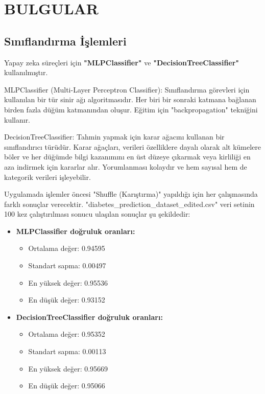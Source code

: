 \newpage
\section{BULGULAR}

\subsection{Sınıflandırma İşlemleri}

Yapay zeka süreçleri için \textbf{"MLPClassifier"} ve \textbf{"DecisionTreeClassifier"} kullanılmıştır. 

MLPClassifier (Multi-Layer Perceptron Classifier): Sınıflandırma görevleri için kullanılan bir tür sinir ağı algoritmasıdır. Her biri bir sonraki katmana bağlanan birden fazla düğüm katmanından oluşur. Eğitim için "backpropagation" tekniğini kullanır.

DecisionTreeClassifier: Tahmin yapmak için karar ağacını kullanan bir sınıflandırıcı türüdür. Karar ağaçları, verileri özelliklere dayalı olarak alt kümelere böler ve her düğümde bilgi kazanımını en üst düzeye çıkarmak veya kirliliği en aza indirmek için kararlar alır. Yorumlanması kolaydır ve hem sayısal hem de kategorik verileri işleyebilir.

Uygulamada işlemler öncesi "Shuffle (Karıştırma)" yapıldığı için her çalışmasında farklı sonuçlar verecektir. "diabetes\_prediction\_dataset\_edited.csv" veri setinin 100 kez çalıştırılması sonucu ulaşılan sonuçlar şu şekildedir:

\begin{itemize}
\item \textbf{MLPClassifier doğruluk oranları:}
\begin{itemize}
\item Ortalama değer: 0.94595
\item Standart sapma: 0.00497
\item En yüksek değer: 0.95536
\item En düşük değer: 0.93152
\end{itemize}
\item \textbf{DecisionTreeClassifier doğruluk oranları:}
\begin{itemize}
\item Ortalama değer: 0.95352
\item Standart sapma: 0.00113
\item En yüksek değer: 0.95669
\item En düşük değer: 0.95066
\end{itemize}
\end{itemize}

